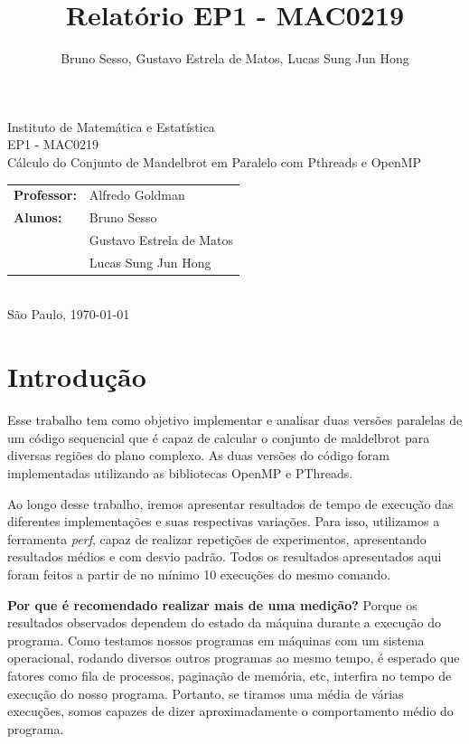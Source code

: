 \documentclass[12pt]{article}
\title{Relatório EP1 - MAC0219}
\author{Bruno Sesso, Gustavo Estrela de Matos, Lucas Sung Jun Hong}
\begin{document}
\doublespacing
\begin{titlepage}
    \vfill
    \begin{center}
        \vspace{0.5\textheight}
        \noindent
        Instituto de Matemática e Estatística \\
        EP1 - MAC0219 \\
        \vfill
        \noindent
        {\Large Cálculo do Conjunto de Mandelbrot
        em Paralelo com Pthreads e OpenMP} \\
        \bigskip
        \bigskip
        \begin{tabular}{ll}
            {\bf Professor:} & {Alfredo Goldman} \\
            {\bf Alunos:}    & {Bruno Sesso} \\
                             & {Gustavo Estrela de Matos} \\
                             & {Lucas Sung Jun Hong} \\
        \end{tabular} \\
        \vspace{\fill}
       \bigskip
        São Paulo, \today \\
       \bigskip
    \end{center}
\end{titlepage}

\pagebreak
\tableofcontents
\pagebreak

\section{Introdução}
Esse trabalho tem como objetivo implementar e analisar duas versões
paralelas de um código sequencial que é capaz de calcular o conjunto de
maldelbrot para diversas regiões do plano complexo. As duas versões do
código foram implementadas utilizando as bibliotecas OpenMP e PThreads.

Ao longo desse trabalho, iremos apresentar resultados de tempo de 
execução das diferentes implementações e suas respectivas variações.
Para isso, utilizamos a ferramenta {\em perf}, capaz de realizar 
repetições de experimentos, apresentando resultados médios e com desvio
padrão. Todos os resultados apresentados aqui foram feitos a partir de
no mínimo 10 execuções do mesmo comando.


    {\bf Por que é recomendado realizar mais de uma medição?} 
        Porque os resultados observados dependem do estado da máquina
        durante a execução do programa. Como testamos nossos programas
        em máquinas com um sistema operacional, rodando diversos outros
        programas ao mesmo tempo, é esperado que fatores como fila de
        processos, paginação de memória, etc, interfira no tempo de 
        execução do nosso programa. Portanto, se tiramos uma média
        de várias execuções, somos capazes de dizer aproximadamente
        o comportamento médio do programa.
        
\end{document}
